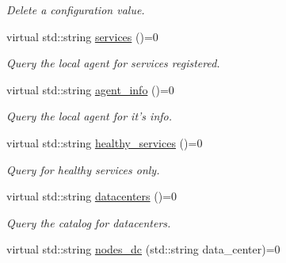 \begin{DoxyCompactItemize}
\begin{DoxyCompactList}\small\item\em Delete a configuration value. \end{DoxyCompactList}\item 
\hypertarget{classConsulInterface_ad130a602282f9854a2eae856bb60a745}{virtual std\-::string \hyperlink{classConsulInterface_ad130a602282f9854a2eae856bb60a745}{services} ()=0}\label{classConsulInterface_ad130a602282f9854a2eae856bb60a745}

\begin{DoxyCompactList}\small\item\em Query the local agent for services registered. \end{DoxyCompactList}\item 
\hypertarget{classConsulInterface_a6fb0bda867b267614b44328fd044859e}{virtual std\-::string \hyperlink{classConsulInterface_a6fb0bda867b267614b44328fd044859e}{agent\-\_\-info} ()=0}\label{classConsulInterface_a6fb0bda867b267614b44328fd044859e}

\begin{DoxyCompactList}\small\item\em Query the local agent for it's info. \end{DoxyCompactList}\item 
\hypertarget{classConsulInterface_a229eaac89811b9e1f5f3c9ec70ea68aa}{virtual std\-::string \hyperlink{classConsulInterface_a229eaac89811b9e1f5f3c9ec70ea68aa}{healthy\-\_\-services} ()=0}\label{classConsulInterface_a229eaac89811b9e1f5f3c9ec70ea68aa}

\begin{DoxyCompactList}\small\item\em Query for healthy services only. \end{DoxyCompactList}\item 
\hypertarget{classConsulInterface_a16848fcc856afae488c55e4f4febf268}{virtual std\-::string \hyperlink{classConsulInterface_a16848fcc856afae488c55e4f4febf268}{datacenters} ()=0}\label{classConsulInterface_a16848fcc856afae488c55e4f4febf268}

\begin{DoxyCompactList}\small\item\em Query the catalog for datacenters. \end{DoxyCompactList}\item 
\hypertarget{classConsulInterface_a0831246af1b80ce5bbe074a47333c615}{virtual std\-::string \hyperlink{classConsulInterface_a0831246af1b80ce5bbe074a47333c615}{nodes\-\_\-dc} (std\-::string data\-\_\-center)=0}\label{classConsulInterface_a0831246af1b80ce5bbe074a47333c615}


\end{DoxyCompactItemize}
